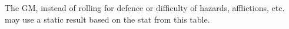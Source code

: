 

The GM, instead of rolling for defence or difficulty of hazards, afflictions, etc. may use a static result based on the stat from this table.


\vspace*{-0.5ex}